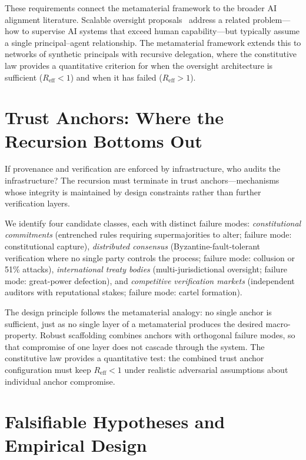\documentclass[runningheads]{llncs}
\begin{document}
These requirements connect the metamaterial framework to the broader AI alignment literature. Scalable oversight proposals~\cite{christiano2017deep,bowman2022measuring} address a related problem---how to supervise AI systems that exceed human capability---but typically assume a single principal--agent relationship. The metamaterial framework extends this to networks of synthetic principals with recursive delegation, where the constitutive law provides a quantitative criterion for when the oversight architecture is sufficient ($R_{\mathrm{eff}} < 1$) and when it has failed ($R_{\mathrm{eff}} > 1$).


\section{Trust Anchors: Where the Recursion Bottoms Out}
\label{sec:trust}

If provenance and verification are enforced by infrastructure, who audits the infrastructure? The recursion must terminate in trust anchors---mechanisms whose integrity is maintained by design constraints rather than further verification layers.

We identify four candidate classes, each with distinct failure modes: \emph{constitutional commitments} (entrenched rules requiring supermajorities to alter; failure mode: constitutional capture), \emph{distributed consensus} (Byzantine-fault-tolerant verification where no single party controls the process; failure mode: collusion or 51\% attacks), \emph{international treaty bodies} (multi-jurisdictional oversight; failure mode: great-power defection), and \emph{competitive verification markets} (independent auditors with reputational stakes; failure mode: cartel formation).

The design principle follows the metamaterial analogy: no single anchor is sufficient, just as no single layer of a metamaterial produces the desired macro-property. Robust scaffolding combines anchors with orthogonal failure modes, so that compromise of one layer does not cascade through the system. The constitutive law provides a quantitative test: the combined trust anchor configuration must keep $R_{\mathrm{eff}} < 1$ under realistic adversarial assumptions about individual anchor compromise.


\section{Falsifiable Hypotheses and Empirical Design}
\label{sec:empirical}
\end{document}
